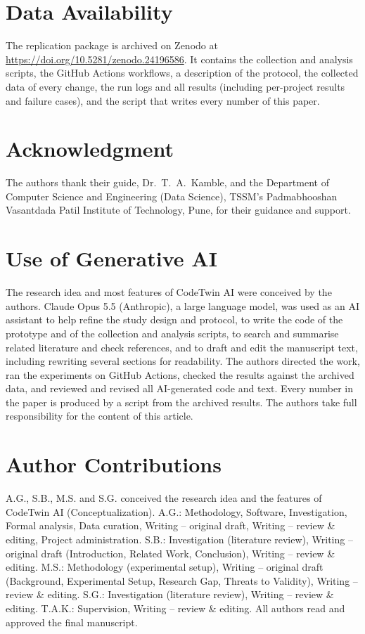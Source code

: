 \documentclass[conference]{IEEEtran}
\begin{document}
\section*{Data Availability}
The replication package is archived on Zenodo at \url{https://doi.org/10.5281/zenodo.24196586}. It contains the collection and analysis scripts, the GitHub Actions workflows, a description of the protocol, the collected data of every change, the run logs and all results (including per-project results and failure cases), and the script that writes every number of this paper.

\section*{Acknowledgment}
The authors thank their guide, Dr.\ T.~A.\ Kamble, and the Department of Computer Science and Engineering (Data Science), TSSM's Padmabhooshan Vasantdada Patil Institute of Technology, Pune, for their guidance and support.
\section*{Use of Generative AI}
The research idea and most features of CodeTwin AI were conceived by the authors. Claude Opus 5.5 (Anthropic), a large language model, was used as an AI assistant to help refine the study design and protocol, to write the code of the prototype and of the collection and analysis scripts, to search and summarise related literature and check references, and to draft and edit the manuscript text, including rewriting several sections for readability. The authors directed the work, ran the experiments on GitHub Actions, checked the results against the archived data, and reviewed and revised all AI-generated code and text. Every number in the paper is produced by a script from the archived results. The authors take full responsibility for the content of this article.

\section*{Author Contributions}
A.G., S.B., M.S. and S.G. conceived the research idea and the features of CodeTwin AI (Conceptualization). A.G.: Methodology, Software, Investigation, Formal analysis, Data curation, Writing -- original draft, Writing -- review \& editing, Project administration. S.B.: Investigation (literature review), Writing -- original draft (Introduction, Related Work, Conclusion), Writing -- review \& editing. M.S.: Methodology (experimental setup), Writing -- original draft (Background, Experimental Setup, Research Gap, Threats to Validity), Writing -- review \& editing. S.G.: Investigation (literature review), Writing -- review \& editing. T.A.K.: Supervision, Writing -- review \& editing. All authors read and approved the final manuscript.

\balance


\end{document}
